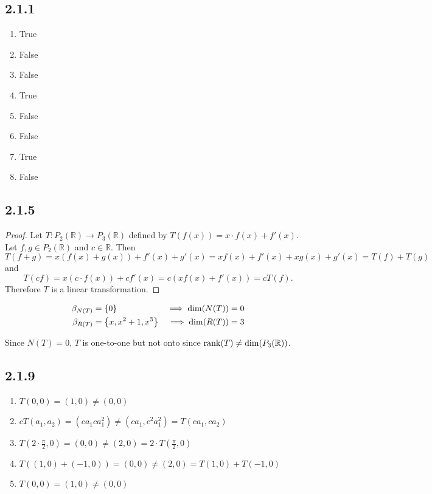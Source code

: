 \documentclass[12pt,titlepage]{extarticle}
\begin{document}
\subsection*{2.1.1}
\begin{enumerate}[label=\alph*)]
    \item True
    \item False
    \item False
    \item True
    \item False
    \item False
    \item True
    \item False
\end{enumerate}

\subsection*{2.1.5}
\begin{proof}
    Let $T : P_2 (\mathbb{R}) \to P_3 (\mathbb{R})$ defined by $T(f(x)) = x \cdot f(x) + f'(x)$. Let $f,g \in P_2 (\mathbb{R})$ and $c \in \mathbb{R}$. Then
    \[
        T(f + g) = x (f(x) + g(x)) + f'(x) + g'(x) = x f(x) + f'(x) + x g(x) + g'(x) = T(f) + T(g)
    \]
    and
    \[
        T(cf) = x (c\cdot f(x)) + c f'(x) = c (x f(x) + f'(x)) = c T(f).
    \]
    Therefore $T$ is a linear transformation.
\end{proof}
\begin{align*}
    \beta_{N(T)} &= \qty{ 0 } &\implies \dim(N(T)) = 0 \\
    \beta_{R(T)} &= \qty{ x, x^2 + 1, x^3 } &\implies \dim(R(T)) = 3
\end{align*}

Since $N(T) = \qty{0}$, $T$ is one-to-one but not onto since $\rank(T) \neq \dim(P_3(\mathbb{R}))$.

\subsection*{2.1.9}
\begin{enumerate}
    \item $T(0,0) = (1,0) \neq (0,0)$
    \item $cT(a_1, a_2) = (ca_1 ca_1^2) \neq (ca_1, c^2 a_1^2) = T(ca_1, ca_2)$
    \item $T(2\cdot \frac{\pi}{2}, 0) = (0,0) \neq (2,0) = 2\cdot T(\frac{\pi}{2},0)$
    \item $T((1,0) + (-1,0)) = (0,0) \neq (2,0) = T(1,0) + T(-1,0)$
    \item $T(0,0) = (1, 0) \neq (0,0)$
\end{enumerate}
\end{document}
